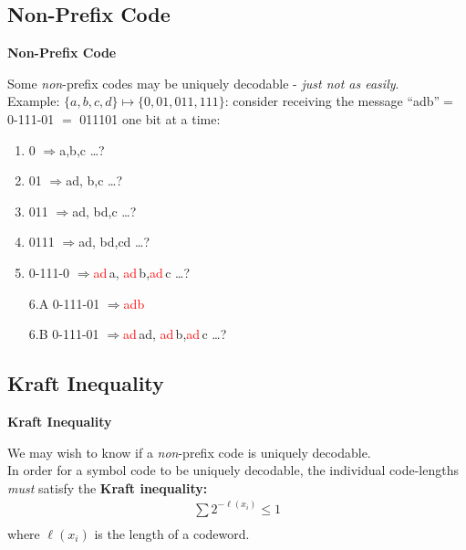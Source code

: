 \documentclass[compress]{beamer}        %
\makeatletter
\newcommand{\tcb}{\textcolor{beamer@blendedblue}}
\newcommand{\tcr}{\textcolor{red}}
\makeatother
\begin{document}
\subsection{Non-Prefix Code}
\begin{frame}{\bf \tcb{Non-Prefix Code}}

Some \emph{non}-prefix codes may be uniquely decodable - \emph{just not as easily}.\\[0.4cm]

Example: $\{a,b,c,d\} \mapsto \{0,01,011,111\}$: consider receiving the message ``adb''$=$ 0-111-01 $=$ 011101 one bit at a time:\\[0.1cm]
\begin{enumerate}[1.]\itemsep0.25cm
\item 0 \quad$\Rightarrow$\quad a,\quad b,\quad c \ldots?
\item 01 \quad$\Rightarrow$\quad ad, \quad b,\quad c \ldots?
\item 011 \quad$\Rightarrow$\quad ad, \quad bd,\quad c \ldots?
\item 0111 \quad$\Rightarrow$\quad ad, \quad bd,\quad cd \ldots?
\item 0-111-0 \quad$\Rightarrow$\quad \tcr{ad}\,a, \quad \tcr{ad}\,b,\quad \tcr{ad}\,c \ldots?
\item[6.A] 0-111-01 \quad$\Rightarrow$\quad \tcr{adb} 
\item[6.B] 0-111-01 \quad$\Rightarrow$\quad \tcr{ad}\,ad, \quad \tcr{ad}\,b,\quad \tcr{ad}\,c \ldots? 
\end{enumerate}

\end{frame}




\subsection{Kraft Inequality}
\begin{frame}{\bf \tcb{Kraft Inequality}}

We may wish to know if a \emph{non}-prefix code is uniquely decodable.\\[0.7cm]
In order for a symbol code to be uniquely decodable, the individual code-lengths \emph{must} satisfy the {\bf Kraft inequality:}\\[0.1cm]
\begin{align*}
\boxed{\sum 2^{-\ell(x_i)} \le 1}\\[-0.1cm]
\end{align*}
where $\ell(x_i)$ is the length of a codeword.

\end{frame}
\end{document}
